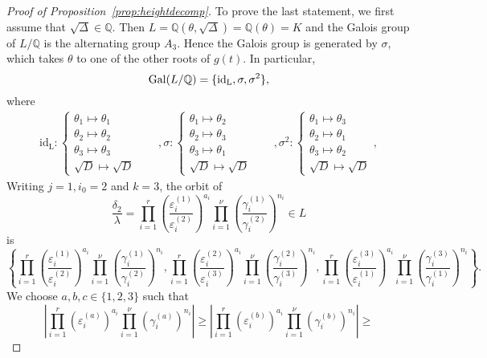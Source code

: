 \begin{proof}[Proof of Proposition~\ref{prop:heightdecomp}]
To prove the last statement, we first assume that $\sqrt{\Delta}\in\mathbb{Q}$. Then $L=\mathbb{Q}(\theta, \sqrt{\Delta}) = \mathbb{Q}(\theta) = K$ and the Galois group of $L/\mathbb{Q}$ is the alternating group $A_3$. Hence the Galois group is generated by $\sigma$, which takes $\theta$ to one of the other roots of $g(t)$. In particular, 
\[\operatorname{Gal}(L/\mathbb{Q}) = \{ \text{id}_\text{L}, \sigma, \sigma^2\},\]
where
\begin{align*}
\text{id}_{\text{L}}: 
\begin{cases}
\theta_1 \mapsto \theta_1\\
\theta_2 \mapsto \theta_2\\
\theta_3 \mapsto \theta_3\\
\sqrt{D} \mapsto \sqrt{D}
\end{cases}
& \quad ,
\sigma: 
\begin{cases}
\theta_1 \mapsto \theta_2\\
\theta_2 \mapsto \theta_3\\
\theta_3 \mapsto \theta_1\\
\sqrt{D} \mapsto \sqrt{D}
\end{cases}
& \quad ,
\sigma^2: 
\begin{cases}
\theta_1 \mapsto \theta_3\\
\theta_2 \mapsto \theta_1\\
\theta_3 \mapsto \theta_2\\
\sqrt{D} \mapsto \sqrt{D}
\end{cases},
\end{align*}
Writing $j = 1, i_0 = 2$ and $k = 3$, the orbit of 
\[\frac{\delta_2}{\lambda}= \prod_{i = 1}^{r}\left( \frac{\varepsilon_i^{(1)}}{\varepsilon_i^{(2)}}\right)^{a_i} \prod_{i = 1}^{\nu} \left( \frac{\gamma_i^{(1)}}{\gamma_i^{(2)}}\right)^{n_i}\in L\]
is
\[\left\{ \prod_{i = 1}^{r}\left( \frac{\varepsilon_i^{(1)}}{\varepsilon_i^{(2)}}\right)^{a_i} \prod_{i = 1}^{\nu} \left( \frac{\gamma_i^{(1)}}{\gamma_i^{(2)}}\right)^{n_i}, 
	\prod_{i = 1}^{r}\left( \frac{\varepsilon_i^{(2)}}{\varepsilon_i^{(3)}}\right)^{a_i} \prod_{i = 1}^{\nu} \left( \frac{\gamma_i^{(2)}}{\gamma_i^{(3)}}\right)^{n_i}, 
	\prod_{i = 1}^{r}\left( \frac{\varepsilon_i^{(3)}}{\varepsilon_i^{(1)}}\right)^{a_i} \prod_{i = 1}^{\nu} \left( \frac{\gamma_i^{(3)}}{\gamma_i^{(1)}}\right)^{n_i}\right\}.\]
We choose $a,b,c\in\{1,2,3\}$ such that 
\[ \left|\prod_{i = 1}^{r}\left( \varepsilon_i^{(a)}\right)^{a_i} \prod_{i = 1}^{\nu} \left( \gamma_i^{(a)}\right)^{n_i}\right| \geq
	\left|\prod_{i = 1}^{r}\left( \varepsilon_i^{(b)}\right)^{a_i} \prod_{i = 1}^{\nu} \left( \gamma_i^{(b)}\right)^{n_i}\right| \geq
\]
\end{proof}
